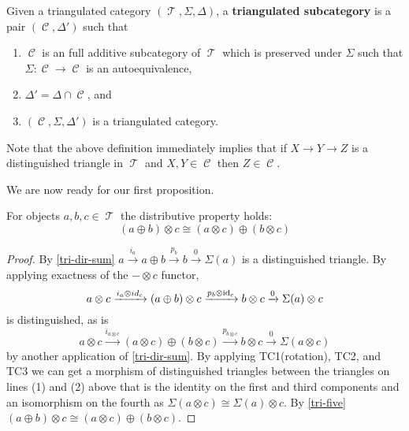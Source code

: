 \documentclass[11pt]{article}
\DeclareMathOperator{\CC}{\mathcal{C}}
\DeclareMathOperator{\TT}{\mathcal{T}}
\begin{document}
\begin{defn}
Given a triangulated category $(\TT,\Sigma,\Delta)$, a \textbf{triangulated subcategory} is a pair $(\CC,\Delta')$ such that
\begin{enumerate}[1.]
	\item $\CC$ is an full additive subcategory of $\TT$ which is preserved under $\Sigma$ such that $\Sigma: \CC \to \CC$ is an autoequivalence,
	\item $\Delta' = \Delta \cap \CC$, and
	\item $(\CC,\Sigma,\Delta')$ is a triangulated category.
\end{enumerate}
\end{defn}

\begin{rmk}
Note that the above definition immediately implies that if $X \to Y \to Z$ is a distinguished triangle in $\TT$ and $X,Y \in \CC$ then $Z \in \CC$.
\end{rmk}

We are now ready for our first proposition.

\begin{prop}
For objects $a,b,c \in \TT$ the distributive property holds:
\[
	(a \oplus b) \otimes c \cong (a \otimes c) \oplus (b \otimes c)
\]
\end{prop}
\begin{proof}\label{distribute}
By \autoref{tri-dir-sum} $a \xrightarrow{i_a} a \oplus b \xrightarrow{p_b} b \xrightarrow{0} \Sigma(a) $ is a distinguished triangle. By applying exactness of the $- \otimes c$ functor,
\begin{equation}
	a \otimes c \xrightarrow{i_a \otimes id_c} (a \oplus b) \otimes c \xrightarrow{p_b \otimes \operatorname{id}_c} b \otimes c \xrightarrow{ 0} \Sigma(a) \otimes c
\end{equation}
is distinguished, as is
\begin{equation}
	a \otimes c \xrightarrow{i_{a \otimes c}} (a \otimes c) \oplus (b \otimes c) \xrightarrow{p_{b \otimes c}} b \otimes c \xrightarrow{0} \Sigma(a \otimes c)
\end{equation}
by another application of \autoref{tri-dir-sum}. By applying TC1(rotation), TC2, and TC3 we can get a morphism of distinguished triangles between the triangles on lines (1) and (2) above that is the identity on the first and third components and an isomorphism on the fourth as $\Sigma(a \otimes c) \cong \Sigma(a) \otimes c$. By \autoref{tri-five} $(a \oplus b) \otimes c \cong (a \otimes c) \oplus (b \otimes c)$.
\end{proof}
\end{document}
